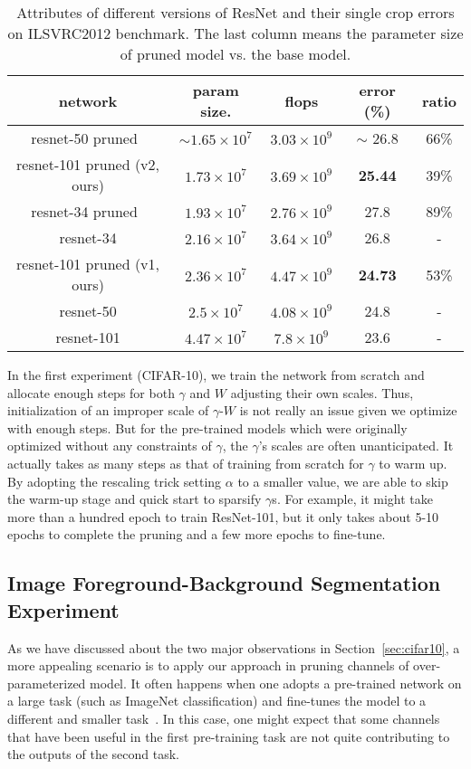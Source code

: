 \documentclass{article} %
\begin{document}
\begin{table}[htp]\centering
\begin{tabular}{ccccc}
network & param size. & flops & error (\%) & ratio \\\hline
resnet-50 pruned~\citep{huang2017data} & $\sim 1.65 \times 10^7$ & $3.03 \times 10^9$ & $\sim$ 26.8 & 66\% \\
resnet-101 pruned (v2, ours) & $1.73 \times 10^7$ & $3.69 \times 10^9$ & \textbf{25.44} & 39\% \\
resnet-34 pruned~\citep{li2016pruning} & $1.93 \times 10^7$ & $2.76 \times 10^9$ & 27.8 & 89\% \\
resnet-34 & $2.16 \times 10^7$ & $3.64 \times 10^9$ & 26.8 & - \\\hline
resnet-101 pruned (v1, ours) & $2.36 \times 10^7$ & $4.47 \times 10^9$ & \textbf{24.73} & 53\% \\ 
resnet-50 & $2.5 \times 10^7$ & $4.08 \times 10^9$ & 24.8 & - \\\hline
resnet-101 & $4.47 \times 10^7$ & $7.8 \times 10^9$ & 23.6 & -\\

\end{tabular}
\caption{Attributes of different versions of ResNet and their single crop errors on ILSVRC2012 benchmark.
The last column means the parameter size of pruned model vs. the base model.}
\label{tab:imagenet}
\end{table}

In the first experiment (CIFAR-10), we train the network from scratch and allocate enough steps for both $\gamma$ and $W$ adjusting their own scales. Thus, initialization of an improper scale of $\gamma$-$W$ is not really an issue given we optimize with enough steps. 
But for the pre-trained models which were originally optimized without any constraints of $\gamma$, the $\gamma$’s scales are often unanticipated. It actually takes as many steps as that of training from scratch for $\gamma$ to warm up. By adopting the rescaling trick setting $\alpha$ to a smaller value, we are able to skip the warm-up stage and quick start to sparsify $\gamma$s. For example, it might take more than a hundred epoch to train ResNet-101, but it only takes about 5-10 epochs to complete the pruning and a few more epochs to fine-tune.

\subsection{Image Foreground-Background Segmentation Experiment}
As we have discussed about the two major observations in Section~\ref{sec:cifar10}, a more appealing
scenario is to apply our approach in pruning channels of over-parameterized model. It often happens when one
adopts a pre-trained network on a large task (such as ImageNet classification) 
and fine-tunes the model to a different and smaller task~\citep{molchanov2016pruning}. In this case, one might expect that
some channels that have been useful in the first pre-training task are not quite contributing to 
the outputs of the second task. 
\end{document}
